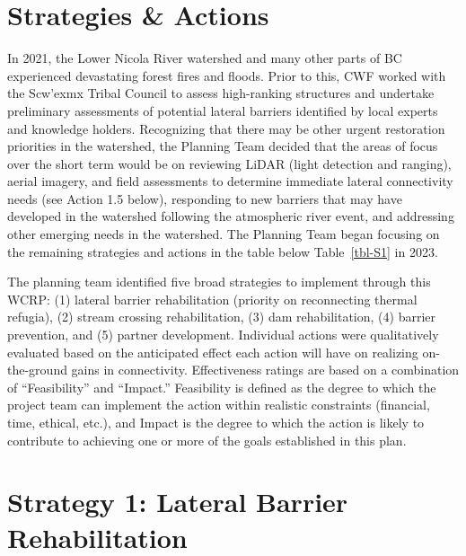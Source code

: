 \documentclass[
  letterpaper,
  DIV=11,
  numbers=noendperiod]{scrreprt}
\begin{document}
\hypertarget{strategies-actions}{%
\section*{Strategies \& Actions}\label{strategies-actions}}


In 2021, the Lower Nicola River watershed and many other parts of BC
experienced devastating forest fires and floods. Prior to this, CWF
worked with the Scw'exmx Tribal Council to assess high-ranking
structures and undertake preliminary assessments of potential lateral
barriers identified by local experts and knowledge holders. Recognizing
that there may be other urgent restoration priorities in the watershed,
the Planning Team decided that the areas of focus over the short term
would be on reviewing LiDAR (light detection and ranging), aerial
imagery, and field assessments to determine immediate lateral
connectivity needs (see Action 1.5 below), responding to new barriers
that may have developed in the watershed following the atmospheric river
event, and addressing other emerging needs in the watershed. The
Planning Team began focusing on the remaining strategies and actions in
the table below Table~\ref{tbl-S1} in 2023.

The planning team identified five broad strategies to implement through
this WCRP: (1) lateral barrier rehabilitation (priority on reconnecting
thermal refugia), (2) stream crossing rehabilitation, (3) dam
rehabilitation, (4) barrier prevention, and (5) partner development.
Individual actions were qualitatively evaluated based on the anticipated
effect each action will have on realizing on-the-ground gains in
connectivity. Effectiveness ratings are based on a combination of
``Feasibility'' and ``Impact.'' Feasibility is defined as the degree to
which the project team can implement the action within realistic
constraints (financial, time, ethical, etc.), and Impact is the degree
to which the action is likely to contribute to achieving one or more of
the goals established in this plan.

\hypertarget{strategy-1-lateral-barrier-rehabilitation}{%
\section*{Strategy 1: Lateral Barrier
Rehabilitation}\label{strategy-1-lateral-barrier-rehabilitation}}
\end{document}
